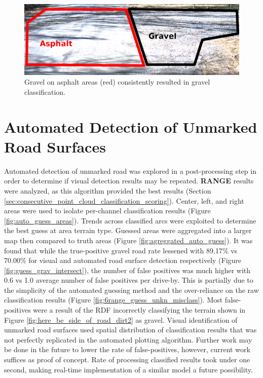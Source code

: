 \documentclass[numbered,pdftex]{ohio-etd}
\begin{document}
{{		\begin{figure}[H]
			\centering
			\includegraphics[width=0.95\linewidth]{Defense_Images/gravel_on_asphalt}
			\caption[Gravel on Asphalt]{Gravel on asphalt areas (red) consistently resulted in gravel classification.}
			\label{fig:gravel_on_asphalt}
		\end{figure}
		
	
	}
	
	\section{Automated Detection of Unmarked Road Surfaces}\label{sec:auto_det}{
		
		
		{Automated detection of unmarked road was explored in a post-processing step in order to determine if visual detection results may be repeated. \textbf{RANGE} results were analyzed, as this algorithm provided the best results (Section \ref{sec:consecutive_point_cloud_classification_scoring}). Center, left, and right areas were used to isolate per-channel classification results (Figure \ref{fig:auto_guess_areas}). Trends across classified arcs were exploited to determine the best guess at area terrain type. Guessed areas were aggregated into a larger map then compared to truth areas (Figure \ref{fig:agreggated_auto_guess}). It was found that while the true-positive gravel road rate lessened with 89.17\% vs 70.00\% for visual and automated road surface detection respectively (Figure \ref{fig:guess_grav_intersect}), the number of false positives was much higher with 0.6 vs 1.0 average number of false positives per drive-by. This is partially due to the simplicity of the automated guessing method and the over-reliance on the raw classification results (Figure \ref{fig:6range_guess_unkn_misclass}). Most false-positives were a result of the RDF incorrectly classifying the terrain shown in Figure \ref{fig:here_be_side_of_road_dirt2} as gravel. Visual identification of unmarked road surfaces used spatial distribution of classification results that was not perfectly replicated in the automated plotting algorithm. Further work may be done in the future to lower the rate of false-positives, however, current work suffices as proof of concept. Rate of processing classified results took under one second, making real-time implementation of a similar model a future possibility. }
		
}}
\end{document}
